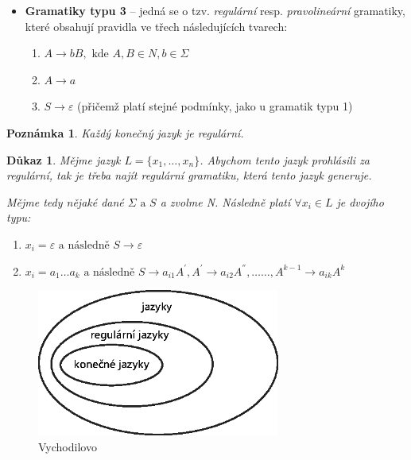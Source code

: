 \documentclass[10pt, a4paper, titlepage]{article}
\theoremstyle{note}
\newtheorem{dukaz}{Důkaz}
\newtheorem{poznamka}{Poznámka}
\begin{document}
\begin{itemize}
\item
\textbf{Gramatiky typu 3\label{gram-3}} -- jedná se o tzv. \emph{regulární} resp. \emph{pravolineární} gramatiky, které obsahují pravidla ve třech následujících tvarech:

\begin{enumerate}
\item
$A \rightarrow bB, \text{ kde } A,B \in N, b \in \Sigma$

\item
$A \rightarrow a$

\item
$S \rightarrow \varepsilon$ (přičemž platí stejné podmínky, jako u gramatik typu 1)
\end{enumerate}

\end{itemize}

\begin{poznamka}
Každý konečný jazyk je regulární.
\end{poznamka}

\begin{dukaz}
Mějme jazyk $L = \lbrace x_{1},\ldots, x_{n} \rbrace$. Abychom tento jazyk prohlásili za regulární, tak je třeba najít regulární gramatiku,
která tento jazyk generuje.

Mějme tedy nějaké dané $\Sigma \text{ a } S$ a zvolme \emph{N}. Následně platí $\forall x_{i} \in L$ je dvojího typu:

\begin{enumerate}
\item
$x_{i} = \varepsilon \text{ a následně } S \rightarrow \varepsilon$

\item
$x_{i} = a_{1}\ldots a_{k} \text{ a následně } S \rightarrow a_{i1}A^{'}, A^{'} \rightarrow a_{i2}A^{''},\ldots\ldots, A^{k-1} \rightarrow a_{ik}A^{k}$
\end{enumerate}
\end{dukaz}

\begin{figure}[ht]
\centering\includegraphics[width=8cm]{vajicko-1.eps}
\caption{Vychodilovo }\label{obr-2}
\end{figure}
\end{document}
